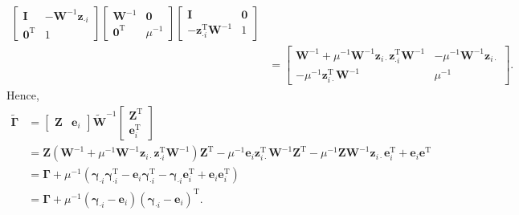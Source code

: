 \documentclass{article}
\begin{document}
\begin{appendices}
$$\begin{aligned}
\begin{bmatrix}
      \mathbf{I} & -\mathbf{W}^{-1}{\boldsymbol{z}}_{\cdot i}  \\ \boldsymbol{0}^\mathrm{T} & 1
    \end{bmatrix}\begin{bmatrix}
      \mathbf{W}^{-1} & \boldsymbol{0} \\ {\boldsymbol{0}}^{\mathrm{T}} & \mu^{-1}
    \end{bmatrix}\begin{bmatrix}
      \mathbf{I} & \boldsymbol{0} \\ -{\boldsymbol{z}}_{\cdot i}^{\mathrm{T}} \mathbf{W}^{-1} & 1
    \end{bmatrix} \\
    &= \begin{bmatrix}
      \mathbf{W}^{-1} + \mu^{-1}\mathbf{W}^{-1}\boldsymbol{z}_{i \cdot}{\boldsymbol{z}}_{\cdot i}^{\mathrm{T}}\mathbf{W}^{-1} & -\mu^{-1}\mathbf{W}^{-1}\boldsymbol{z}_{i \cdot} \\
      -\mu^{-1}\boldsymbol{z}_{i \cdot}^\mathrm{T}\mathbf{W}^{-1} & \mu^{-1}
    \end{bmatrix}.
    \end{aligned}$$
    Hence, $$
    \begin{aligned}
      \widetilde{\mathbf{\Gamma}} &= \begin{bmatrix}
        \mathbf{Z} & \boldsymbol{e}_i
      \end{bmatrix}\widetilde{\mathbf{W}}^{-1}\begin{bmatrix}
        {\mathbf{Z}}^{\mathrm{T}} \\ {\boldsymbol{e}}_i^{\mathrm{T}}
      \end{bmatrix} \\
      &= \mathbf{Z}(\mathbf{W}^{-1} + \mu^{-1}\mathbf{W}^{-1}\boldsymbol{z}_{i \cdot}{\boldsymbol{z}}_{\cdot i}^{\mathrm{T}}\mathbf{W}^{-1}){\mathbf{Z}}^{\mathrm{T}} - \mu^{-1}\boldsymbol{e}_i \boldsymbol{z}_{i \cdot}^\mathrm{T}\mathbf{W}^{-1}{\mathbf{Z}}^{\mathrm{T}} - \mu^{-1}\mathbf{Z}\mathbf{W}^{-1}\boldsymbol{z}_{i \cdot}\boldsymbol{e}_i^\mathrm{T} + \boldsymbol{e}_i {\boldsymbol{e}}^{\mathrm{T}} \\
      &= \mathbf{\Gamma} + \mu^{-1}(\boldsymbol{\gamma}_{\cdot i}\boldsymbol{\gamma}_{\cdot i}^\mathrm{T} - \boldsymbol{e}_i\boldsymbol{\gamma}_{\cdot i}^\mathrm{T} - \boldsymbol{\gamma}_{\cdot i}{\boldsymbol{e}}_i^{\mathrm{T}} + \boldsymbol{e}_i {\boldsymbol{e}}_i^{\mathrm{T}}) \\
      &= \mathbf{\Gamma} + \mu^{-1}(\boldsymbol{\gamma}_{\cdot i} - \boldsymbol{e}_i)(\boldsymbol{\gamma}_{\cdot i} - \boldsymbol{e}_i)^\mathrm{T}.

\end{aligned}$$
\end{appendices}
\end{document}
